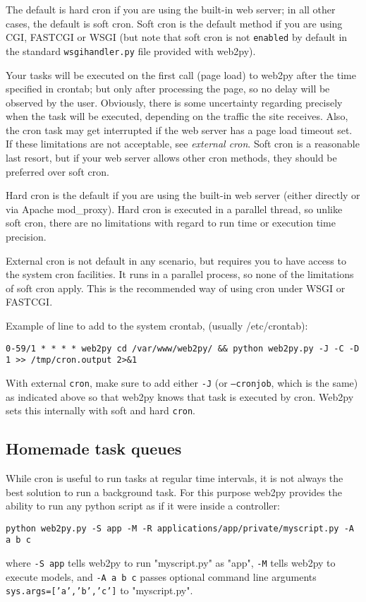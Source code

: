 \documentclass[justified,sixbynine,notoc]{tufte-book}
\def\ft{\small\tt}
\begin{document}
\begin{fullwidth}
The default is hard cron if you are using the built-in web server; in all other cases, the default is soft cron.  Soft cron is the default method if you are using CGI, FASTCGI or WSGI (but note that soft cron is not {\ft enabled} by default in the standard {\ft wsgihandler.py} file provided with web2py).

Your tasks will be executed on the first call (page load) to web2py after the time specified in crontab; but only after processing the page, so no delay will be observed by the user. Obviously, there is some uncertainty regarding precisely when the task will be executed, depending on the traffic the site receives. Also, the cron task may get interrupted if the web server has a page load timeout set. If these limitations are not acceptable, see {\it external cron}. Soft cron is a reasonable last resort, but if your web server allows other cron methods, they should be preferred over soft cron.

Hard cron is the default if you are using the built-in web server (either directly or via Apache mod\_proxy). Hard cron is executed in a parallel thread, so unlike soft cron, there are no limitations with regard to run time or execution time precision.

External cron is not default in any scenario, but requires you to have access to the system cron facilities. It runs in a parallel process, so none of the limitations of soft cron apply. This is the recommended way of using cron under WSGI or FASTCGI.

Example of line to add to the system crontab, (usually /etc/crontab):
\begin{lstlisting}
0-59/1 * * * * web2py cd /var/www/web2py/ && python web2py.py -J -C -D 1 >> /tmp/cron.output 2>&1
\end{lstlisting}

With external {\ft cron}, make sure to add either {\ft -J} (or {\ft --cronjob}, which is the same) as indicated above so that web2py knows that task is executed by cron. Web2py sets this internally with soft and hard {\ft cron}.

\goodbreak\subsection{Homemade task queues}

While cron is useful to run tasks at regular time intervals, it is not always the best solution to run a background task. For this purpose web2py provides the ability to run any python script as if it were inside a controller:
\begin{lstlisting}
python web2py.py -S app -M -R applications/app/private/myscript.py -A a b c
\end{lstlisting}
\noindent where {\ft -S app} tells web2py to run "myscript.py" as "app", {\ft -M} tells web2py to execute models, and {\ft -A a b c} passes optional command line arguments {\ft sys.args=['a','b','c']} to "myscript.py".


\end{fullwidth}
\end{document}

